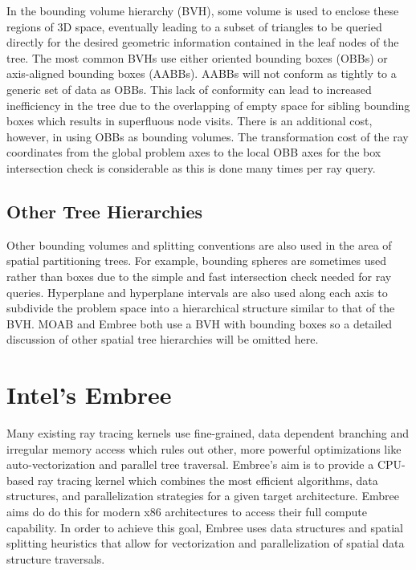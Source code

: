 \documentclass{anstrans}
\begin{document}
In the bounding volume hierarchy (BVH), some volume is used to enclose these regions of 3D space, eventually leading to a subset of triangles to be queried directly for the desired geometric information contained in the leaf nodes of the tree. The most common BVHs use either oriented bounding boxes (OBBs) or axis-aligned bounding boxes (AABBs). AABBs will not conform as tightly to a generic set of data as OBBs. This lack of conformity can lead to increased inefficiency in the tree due to the overlapping of empty space for sibling bounding boxes which results in superfluous node visits. There is an additional cost, however, in using OBBs as bounding volumes. The transformation cost of the ray coordinates from the global problem axes to the local OBB axes for the box intersection check is considerable as this is done many times per ray query. 

\subsection{Other Tree Hierarchies} 

Other bounding volumes and splitting conventions are also used in the area of spatial partitioning trees. For example, bounding spheres are sometimes used rather than boxes due to the simple and fast intersection check needed for ray queries. Hyperplane and hyperplane intervals are also used along each axis to subdivide the problem space into a hierarchical structure similar to that of the BVH. MOAB and Embree both use a BVH with bounding boxes so a detailed discussion of other spatial tree hierarchies will be omitted here.

\section{Intel's Embree}

Many existing ray tracing kernels use fine-grained, data dependent branching and irregular memory access which rules out other, more powerful optimizations like auto-vectorization and parallel tree traversal. Embree's aim is to provide a CPU-based ray tracing kernel which combines the most efficient algorithms, data structures, and parallelization strategies for a given target architecture. Embree aims do do this for modern x86 architectures to access their full compute capability. In order to achieve this goal, Embree uses data structures and spatial splitting heuristics that allow for vectorization and parallelization of spatial data structure traversals.
\end{document}
